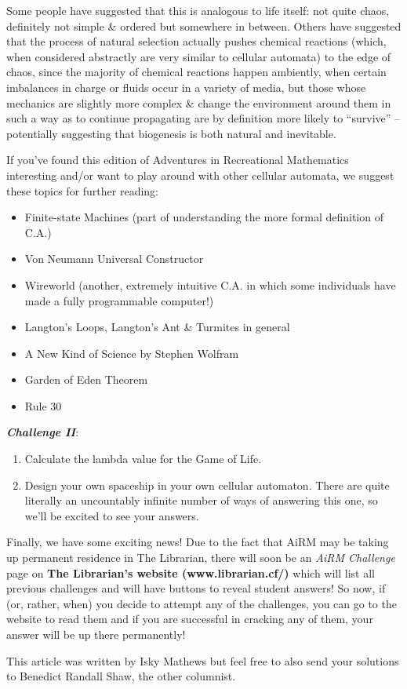 Some people have suggested that this is analogous to life itself: not
quite chaos, definitely not simple \& ordered but somewhere in between.
Others have suggested that the process of natural selection actually
pushes chemical reactions (which, when considered abstractly are very
similar to cellular automata) to the edge of chaos, since the majority
of chemical reactions happen ambiently, when certain imbalances in
charge or fluids occur in a variety of media, but those whose mechanics
are slightly more complex \& change the environment around them in such
a way as to continue propagating are by definition more likely to
``survive'' -- potentially suggesting that biogenesis is both natural
and inevitable.

If you've found this edition of Adventures in Recreational Mathematics
interesting and/or want to play around with other cellular automata, we
suggest these topics for further reading:

\begin{itemize}
\item
  Finite-state Machines (part of understanding the more formal
  definition of C.A.)
\item
  Von Neumann Universal Constructor
\item
  Wireworld (another, extremely intuitive C.A. in which some individuals
  have made a fully programmable computer!)
\item
  Langton's Loops, Langton's Ant \& Turmites in general
\item
  A New Kind of Science by Stephen Wolfram
\item
  Garden of Eden Theorem
\item
  Rule 30
\end{itemize}

\textbf{\emph{Challenge II}}:

\begin{enumerate}
\def\labelenumi{\arabic{enumi}.}
\item
  Calculate the lambda value for the Game of Life.
\item
  Design your own spaceship in your own cellular automaton. There are
  quite literally an uncountably infinite number of ways of answering
  this one, so we'll be excited to see your answers.
\end{enumerate}

Finally, we have some exciting news! Due to the fact that AiRM may be
taking up permanent residence in The Librarian, there will soon be an
\emph{AiRM Challenge} page on \textbf{The Librarian's website
(www.librarian.cf/)} which will list all previous challenges and will
have buttons to reveal student answers! So now, if (or, rather, when)
you decide to attempt any of the challenges, you can go to the website
to read them and if you are successful in cracking any of them, your
answer will be up there permanently!

This article was written by Isky Mathews but feel free to also send your
solutions to Benedict Randall Shaw, the other columnist.
